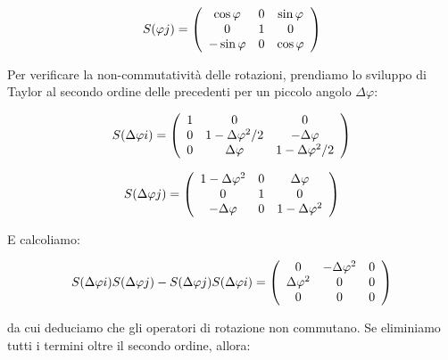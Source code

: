 	\begin{equation}
		S(\varphi j) = 
		\left ( \begin{array}{c c c}
			\cos \varphi & 0 & \sin \varphi \\
			0 & 1 & 0 \\
			-\sin \varphi & 0 & \cos \varphi \\
		\end{array} \right )
	\end{equation}

Per verificare la non-commutativit\`a delle rotazioni, prendiamo lo sviluppo di Taylor al secondo ordine delle precedenti per un piccolo angolo $\Delta \varphi$:

	\begin{equation}
		S(\Delta \varphi i) = 
		\left ( \begin{array}{c c c}
			1 & 0 & 0 \\
			0 & 1 - \Delta \varphi^2 / 2 & - \Delta \varphi \\
			0 & \Delta \varphi & 1 - \Delta \varphi^2 / 2 \\
		\end{array} \right )
	\end{equation}

	\begin{equation}
		S(\Delta \varphi j) = 
		\left ( \begin{array}{c c c}
			1 - \Delta \varphi^2 & 0 & \Delta \varphi \\
			0 & 1 & 0 \\
			-\Delta \varphi & 0 & 1 - \Delta \varphi^2 \\
		\end{array} \right )
	\end{equation}

E calcoliamo:

	\begin{equation}
		S(\Delta \varphi i) S(\Delta \varphi j) - S(\Delta \varphi j) S(\Delta \varphi i) =
			\left ( \begin{array}{c c c}
				0 & - \Delta \varphi^2 & 0 \\
				\Delta \varphi^2 & 0 & 0 \\
				0 & 0 & 0 \\
			\end{array} \right )
	\end{equation}

da cui deduciamo che gli operatori di rotazione non commutano. Se eliminiamo tutti i termini oltre il secondo ordine, allora:
	

